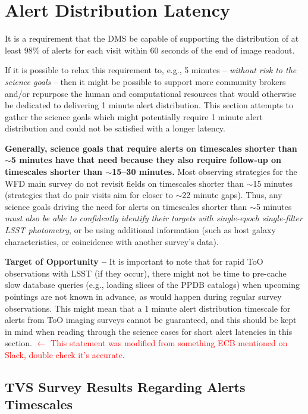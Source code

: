 \documentclass[DM,lsstdraft,authoryear,toc]{lsstdoc}
\begin{document}
\clearpage
\section{Alert Distribution Latency} \label{sec:latency}

It is a requirement that the DMS be capable of supporting the distribution of at least 98\% of alerts for each visit within 60 seconds of the end of image readout.

If it is possible to relax this requirement to, e.g., 5 minutes -- \emph{without risk to the science goals} -- then it might be possible to support more community brokers and/or repurpose the human and computational resources that would otherwise be dedicated to delivering 1 minute alert distribution. This section attempts to gather the science goals which might potentially require 1 minute alert distribution and could not be satisfied with a longer latency.

{\bf Generally, science goals that require alerts on timescales shorter than $\sim$5 minutes have that need because they also require follow-up on timescales shorter than $\sim$15--30 minutes.} Most observing strategies for the WFD main survey do not revisit fields on timescales shorter than $\sim$15 minutes (strategies that do pair visits aim for closer to $\sim$22 minute gaps). Thus, any science goals driving the need for alerts on timescales shorter than $\sim$5 minutes \emph{must also be able to confidently identify their targets with single-epoch single-filter LSST photometry}, or be using additional information (such as host galaxy characteristics, or coincidence with another survey's data).

{\bf Target of Opportunity --} It is important to note that for rapid ToO observations with LSST (if they occur), there might not be time to pre-cache slow database queries (e.g., loading slices of the PPDB catalogs) when upcoming pointings are not known in advance, as would happen during regular survey observations. This might mean that a 1 minute alert distribution timescale for alerts from ToO imaging surveys cannot be guaranteed, and this should be kept in mind when reading through the science cases for short alert latencies in this section. \textcolor{red}{$\leftarrow$ This statement was modified from something ECB mentioned on Slack, double check it's accurate}.

\subsection{TVS Survey Results Regarding Alerts Timescales}\label{ssec:latency_tvs}
\end{document}
